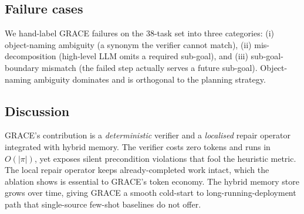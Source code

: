 \subsection{Failure cases}\label{sec:failure}

We hand-label GRACE failures on the 38-task set into three
categories: (i) object-naming ambiguity (a synonym the verifier
cannot match), (ii) mis-decomposition (high-level LLM omits a
required sub-goal), and (iii) sub-goal-boundary mismatch (the failed
step actually serves a future sub-goal). Object-naming ambiguity
dominates and is orthogonal to the planning strategy.

\subsection{Discussion}\label{sec:discussion}

GRACE's contribution is a \emph{deterministic} verifier and a
\emph{localised} repair operator integrated with hybrid memory. The
verifier costs zero tokens and runs in $O(|\pi|)$, yet exposes
silent precondition violations that fool the heuristic metric. The
local repair operator keeps already-completed work intact, which the
ablation shows is essential to GRACE's token economy. The hybrid
memory store grows over time, giving GRACE a smooth cold-start to
long-running-deployment path that single-source few-shot baselines
do not offer.
